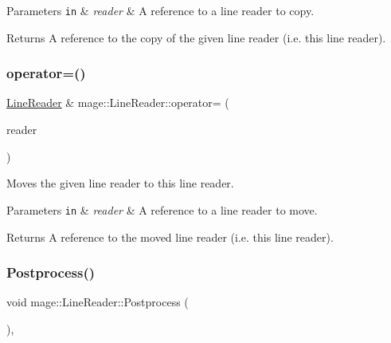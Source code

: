 \begin{DoxyParams}[1]{Parameters}
\mbox{\tt in}  & {\em reader} & A reference to a line reader to copy. \\
\hline
\end{DoxyParams}
\begin{DoxyReturn}{Returns}
A reference to the copy of the given line reader (i.\+e. this line reader). 
\end{DoxyReturn}
\mbox{\label{classmage_1_1_line_reader_a3ba691cb32a1ab5dcbe75498068c1b86}} 
\subsubsection{\texorpdfstring{operator=()}{operator=()}\hspace{0.1cm}{\footnotesize\ttfamily [2/2]}}
{\footnotesize\ttfamily \mbox{\hyperlink{classmage_1_1_line_reader}{Line\+Reader}} \& mage\+::\+Line\+Reader\+::operator= (\begin{DoxyParamCaption}\item[{\mbox{\hyperlink{classmage_1_1_line_reader}{Line\+Reader}} \&\&}]{reader }\end{DoxyParamCaption})\hspace{0.3cm}{\ttfamily [noexcept]}}

Moves the given line reader to this line reader.


\begin{DoxyParams}[1]{Parameters}
\mbox{\tt in}  & {\em reader} & A reference to a line reader to move. \\
\hline
\end{DoxyParams}
\begin{DoxyReturn}{Returns}
A reference to the moved line reader (i.\+e. this line reader). 
\end{DoxyReturn}
\mbox{\label{classmage_1_1_line_reader_a51775e07b5f7c9f72441e42d6d3896e1}} 
\subsubsection{\texorpdfstring{Postprocess()}{Postprocess()}}
{\footnotesize\ttfamily void mage\+::\+Line\+Reader\+::\+Postprocess (\begin{DoxyParamCaption}{ }\end{DoxyParamCaption})\hspace{0.3cm}{\ttfamily [private]}, {\ttfamily [virtual]}}

